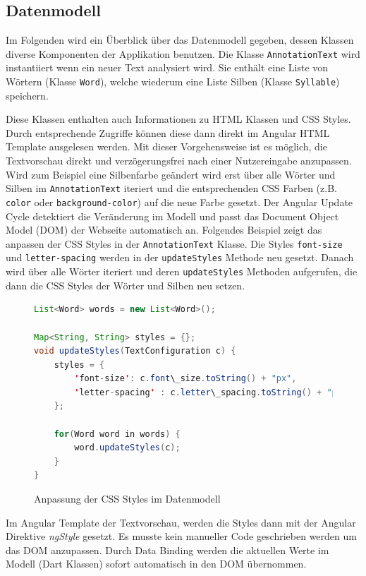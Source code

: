 \subsection{Datenmodell}

Im Folgenden wird ein Überblick über das Datenmodell gegeben, dessen Klassen diverse Komponenten der Applikation benutzen. Die Klasse \texttt{AnnotationText} wird instantiiert wenn ein neuer Text analysiert wird. Sie
enthält eine Liste von Wörtern (Klasse \texttt{Word}), welche wiederum eine Liste Silben (Klasse \texttt{Syllable}) speichern. \\


Diese Klassen enthalten auch Informationen zu HTML Klassen und CSS Styles. Durch entsprechende Zugriffe können diese dann direkt im Angular HTML Template ausgelesen werden. Mit dieser Vorgehensweise ist es möglich, die Textvorschau direkt und verzögerungsfrei nach einer Nutzereingabe anzupassen. Wird zum Beispiel eine Silbenfarbe geändert wird erst über alle Wörter und Silben im \texttt{AnnotationText} iteriert und die entsprechenden CSS Farben (z.B. \texttt{color} oder \texttt{background-color}) auf die neue Farbe gesetzt. Der Angular Update Cycle  detektiert die Veränderung im Modell und passt das Document Object Model (DOM) der Webseite automatisch an. Folgendes Beispiel zeigt das anpassen der CSS Styles in der \texttt{AnnotationText} Klasse. Die Styles \texttt{font-size} und \texttt{letter-spacing} werden in der \texttt{updateStyles} Methode neu gesetzt. Danach wird über alle Wörter iteriert und deren \texttt{updateStyles} Methoden aufgerufen, die dann die CSS Styles der Wörter und Silben neu setzen.

\begin{figure}[h!]
\centering
\begin{lstlisting}[language=Java, frame=single]
List<Word> words = new List<Word>();

Map<String, String> styles = {};
void updateStyles(TextConfiguration c) {
	styles = {
		'font-size': c.font\_size.toString() + "px",
		'letter-spacing' : c.letter\_spacing.toString() + "px"
	};

	for(Word word in words) {
		word.updateStyles(c);
	}
}
\end{lstlisting}
\caption{Anpassung der CSS Styles im Datenmodell}
\end{figure}

Im Angular Template der Textvorschau, werden die Styles dann mit der Angular Direktive \textit{ngStyle} gesetzt. Es musste kein manueller Code geschrieben werden um das DOM anzupassen. Durch Data Binding werden die aktuellen Werte im Modell (Dart Klassen) sofort automatisch in den DOM übernommen.

